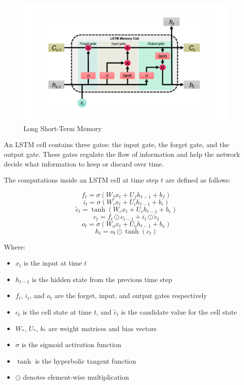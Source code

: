 \documentclass[twocolumn]{llncs}
\begin{document}
\begin{figure}[H]
    \centering
    \includegraphics[width=1\linewidth]{LSTM.png}
    \caption{Long Short-Term Memory}
    \label{fig:boxplot}
\end{figure}


\noindent An LSTM cell contains three gates: the input gate, the forget gate, and the output gate. These gates regulate the flow of information and help the network decide what information to keep or discard over time.

\noindent The computations inside an LSTM cell at time step $t$ are defined as follows:

\begin{equation}
f_t = \sigma(W_f x_t + U_f h_{t-1} + b_f)
\end{equation}
\begin{equation}
i_t = \sigma(W_i x_t + U_i h_{t-1} + b_i)
\end{equation}
\begin{equation}
\tilde{c}_t = \tanh(W_c x_t + U_c h_{t-1} + b_c)
\end{equation}
\begin{equation}
c_t = f_t \odot c_{t-1} + i_t \odot \tilde{c}_t
\end{equation}
\begin{equation}
o_t = \sigma(W_o x_t + U_o h_{t-1} + b_o)
\end{equation}
\begin{equation}
h_t = o_t \odot \tanh(c_t)
\end{equation}

\noindent Where:
\begin{itemize}
    \item $x_t$ is the input at time $t$
    \item $h_{t-1}$ is the hidden state from the previous time step
    \item $f_t$, $i_t$, and $o_t$ are the forget, input, and output gates respectively
    \item $c_t$ is the cell state at time $t$, and $\tilde{c}_t$ is the candidate value for the cell state
    \item $W_*$, $U_*$, $b_*$ are weight matrices and bias vectors
    \item $\sigma$ is the sigmoid activation function
    \item $\tanh$ is the hyperbolic tangent function
    \item $\odot$ denotes element-wise multiplication
\end{itemize}
\end{document}
